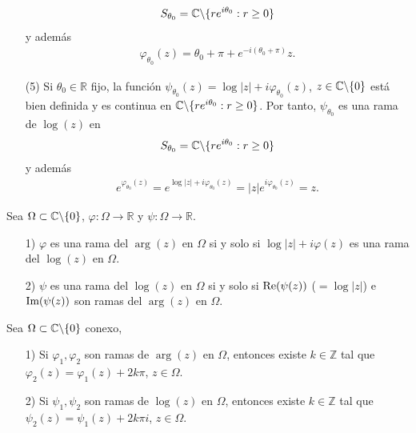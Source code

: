 \begin{ejemplo}
\begin{enumerate}
\begin{align*}
                  S_{\theta_0} = \mathbb{C} \backslash \{ re^{i\theta_0} : r \ge 0 \}
              \end{align*}
              y además
              \begin{align*}
                  \varphi_{\theta_0}(z) = \theta_0 + \pi + e^{-i(\theta_0 + \pi)}z.
              \end{align*}
        \item[(5)] Si $\theta_0 \in \mathbb{R}$ fijo, la función $\psi_{\theta_0}(z) = \log|z| + i\varphi_{\theta_0}(z)$, $z \in \mathbb{C} \backslash \{0\}$ está bien definida y es continua en $\mathbb{C} \backslash \{re^{i\theta_0} : r \ge 0 \}$. Por tanto, $\psi_{\theta_0}$ es una rama de $\log(z)$ en
              \begin{align*}
                  S_{\theta_0} = \mathbb{C} \backslash \{ re^{i\theta_0} : r \ge 0 \}
              \end{align*}
              y además
              \begin{align*}
                  e^{\varphi_{\theta_0}(z)} = e^{\log|z| + i\varphi_{\theta_0}(z)} = |z|e^{i\varphi_{\theta_0}(z)} = z.
              \end{align*}
    \end{enumerate}
\end{ejemplo}

\begin{obs}
    Sea $\Omega \subset \mathbb{C} \backslash \{0\}$, $\varphi : \Omega \longrightarrow \mathbb{R}$ y $\psi : \Omega \longrightarrow \mathbb{R}$.
    \begin{enumerate}
        \item[1)] $\varphi$ es una rama del $\arg(z)$ en $\Omega$ si y solo si $\log|z| + i\varphi(z)$ es una rama del $\log(z)$ en $\Omega$.
        \item[2)] $\psi$ es una rama del $\log(z)$ en $\Omega$ si y solo si $\text{Re}(\psi(z))$ ($= \log|z|$) e $\text{Im}(\psi(z))$ son ramas del $\arg(z)$ en $\Omega$.
    \end{enumerate}
\end{obs}

\begin{prop}
    Sea $\Omega \subset \mathbb{C} \backslash \{0\}$ conexo,
    \begin{enumerate}
        \item[1)] Si $\varphi_1, \varphi_2$ son ramas de $\arg(z)$ en $\Omega$, entonces existe $k \in \mathbb{Z}$ tal que $\varphi_2(z) = \varphi_1(z) + 2k\pi$, $z \in \Omega$.
        \item[2)] Si $\psi_1, \psi_2$ son ramas de $\log(z)$ en $\Omega$, entonces existe $k \in \mathbb{Z}$ tal que $\psi_2(z) = \psi_1(z) + 2k\pi i$, $z \in \Omega$.
    \end{enumerate}
\end{prop}

